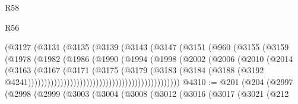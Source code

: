 \begin{lexlean}{R58}
\begin{lexlean}{R56}
\begin{coremodule}
{{{{{{{{{{{{{{{{{{{{{{{{{{{{{{{{{{{{{{{{{{{{{{{{{{{{{{{{{{{{{{{{{{{{{{{{{{{{{{{{{{{{{{{{{{{{{{{{{{{{{{{{{{{{{{{{{{{{{{{{{{{{{{{{{{{{{{{{{{{{{{{{{{{{{{{{{{{{{{{{{{{{{{{{{{{{{{{{{{{{{{{{{{{{{{{{{{{{{{{{{{{{{{{{{{{                                        (@3127
                                          (@3131
                                            (@3135
                                              (@3139
                                                (@3143
                                                  (@3147
                                                    (@3151
                                                      (@960
                                                        (@3155
                                                          (@3159
                                                            (@1978
                                                              (@1982
                                                                (@1986
                                                                  (@1990
                                                                    (@1994
                                                                      (@1998
                                                                        (@2002
                                                                          (@2006
                                                                            (@2010
                                                                              (@2014
                                                                                (@3163
                                                                                  (@3167
                                                                                    (@3171
                                                                                      (@3175
                                                                                        (@3179
                                                                                          (@3183
                                                                                            (@3184
                                                                                              (@3188
                                                                                                (@3192
                                                                                                  @4241)))))))))))))))))))))))))))))))))))))))))))))))
@4310 := @201
    (@204
      (@2997
        (@2998
          (@2999
            (@3003
              (@3004
                (@3008
                  (@3012
                    (@3016
                      (@3017
                        (@3021
                          (@212
}}}}}}}}}}}}}}}}}}}}}}}}}}}}}}}}}}}}}}}}}}}}}}}}}}}}}}}}}}}}}}}}}}}}}}}}}}}}}}}}}}}}}}}}}}}}}}}}}}}}}}}}}}}}}}}}}}}}}}}}}}}}}}}}}}}}}}}}}}}}}}}}}}}}}}}}}}}}}}}}}}}}}}}}}}}}}}}}}}}}}}}}}}}}}}}}}}}}}}}}}}}}}}}}}}}
\end{coremodule}
\end{lexlean}
\end{lexlean}
